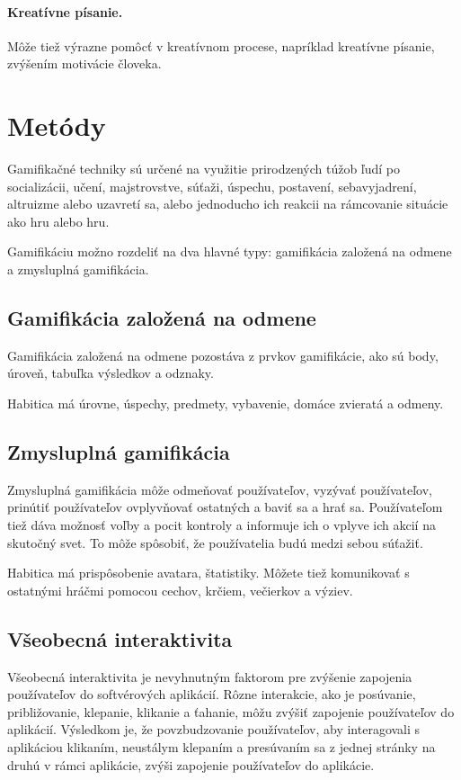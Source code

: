 \documentclass[10pt,twoside,slovak,a4paper]{article}
\begin{document}
\paragraph{Kreatívne písanie.} Môže tiež výrazne pomôcť v kreatívnom procese, napríklad kreatívne písanie, zvýšením motivácie človeka.

\section{Metódy} \label{methods}

Gamifikačné techniky sú určené na využitie prirodzených túžob ľudí po socializácii, učení, 
majstrovstve, súťaži, úspechu, postavení, sebavyjadrení, altruizme alebo uzavretí sa, alebo 
jednoducho ich reakcii na rámcovanie situácie ako hru alebo hru.\cite{Shallow}

Gamifikáciu možno rozdeliť na dva hlavné typy: gamifikácia založená na odmene a zmysluplná gamifikácia. \cite{Methods}

\subsection{Gamifikácia založená na odmene} \label{methods:reward}
Gamifikácia založená na odmene pozostáva z prvkov gamifikácie, ako sú body, úroveň, tabuľka výsledkov a odznaky.

\cite{Methods} Habitica má úrovne, úspechy, predmety, vybavenie, domáce zvieratá a odmeny.

\subsection{Zmysluplná gamifikácia} \label{methods:meaningful}
Zmysluplná gamifikácia môže odmeňovať používateľov, vyzývať používateľov, prinútiť používateľov 
ovplyvňovať ostatných a baviť sa a hrať sa. Používateľom tiež dáva možnosť voľby a pocit kontroly 
a informuje ich o vplyve ich akcií na skutočný svet. To môže spôsobiť, že používatelia 
budú medzi sebou súťažiť.\cite{Methods}

Habitica má prispôsobenie avatara, štatistiky. Môžete tiež komunikovať s ostatnými hráčmi 
pomocou cechov, krčiem, večierkov a výziev.

\subsection{Všeobecná interaktivita} \label{methods:interactivity}
Všeobecná interaktivita je nevyhnutným faktorom pre zvýšenie zapojenia používateľov do 
softvérových aplikácií. Rôzne interakcie, ako je posúvanie, približovanie, klepanie, klikanie a 
ťahanie, môžu zvýšiť zapojenie používateľov do aplikácií. Výsledkom je, že povzbudzovanie 
používateľov, aby interagovali s aplikáciou klikaním, neustálym klepaním a presúvaním sa z 
jednej stránky na druhú v rámci aplikácie, zvýši zapojenie používateľov do aplikácie.\cite{Methods}
\end{document}
